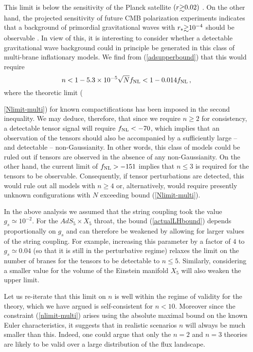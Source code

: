 This limit is below the sensitivity of the Planck satellite 
$(r \gsim 0.02 )$ \cite{planck}. On the other hand, 
the projected sensitivity of future CMB polarization experiments 
indicates that a background of primordial 
gravitational waves with $r_* \gsim 10^{-4}$ 
should be observable \cite{songknox,vpj}. In view of this, 
it is interesting to consider whether
a detectable gravitational wave background could in principle 
be generated in this class of multi-brane inflationary 
models. We find from (\ref{adsupperbound}) that this would require 
\begin{equation}
\label{nlimit-multi}
n < 1 -5.3 \times 10^{-5} \sqrt{N} f_{\mathrm{NL}} < 1-0.014 f_{\mathrm{NL}} \,,
\end{equation}
where the theoretic limit ({\ref{Nlimit-multi}) for 
known compactifications has been imposed in the 
second inequality. We may deduce, therefore, that  
since we require $n \ge 2$ for consistency, a detectable tensor 
signal will require $f_{\mathrm{NL}} < -70$, which implies that an observation of 
the tensors should also be 
accompanied by a sufficiently large -- and detectable -- non-Gaussianity. 
In other words, this class of models could  
be ruled out if tensors are observed in the absence of any
non-Gaussianity. On the other hand, the current 
limit of  $f_{\mathrm{NL}} >-151$ implies that $n \le 3$ is required 
for the tensors to be observable. 
Consequently, if tensor perturbations are detected, this would rule 
out all models with $n \ge  4$ or, alternatively, would require presently 
unknown configurations with $N$ exceeding bound (\ref{Nlimit-multi}). 

In the above analysis we assumed that the string coupling 
took the value $g_s \simeq 10^{-2}$. For the $AdS_5 \times X_5$ throat, 
the bound (\ref{actualLHbound}) depends proportionally on $g_s$ and can 
therefore be weakened by allowing for larger values of the string coupling. 
For example, increasing this parameter by a factor of $4$ 
to $g_s \simeq 0.04$ (so that it is still in the perturbative regime)
relaxes the limit on the number of branes for the tensors to be detectable to 
$n \le 5$. Similarly, considering a smaller value for the 
volume of the Einstein manifold $X_5$ will also weaken the upper limit. 

Let us re-iterate that this limit on $n$ is well within the 
regime of validity for the theory, which we have argued is 
self-consistent for $n<10$. Moreover since the constraint (\ref{nlimit-multi})
arises using the absolute maximal bound on the known 
Euler characteristics, it suggests that in realistic scenarios $n$ will 
always be much smaller than this. Indeed, one could argue that 
only the $n=2$ and $n=3$ theories are
likely to be valid over a large distribution of the flux landscape. 

}
